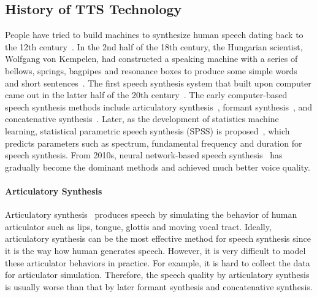 \documentclass{article}
\begin{document}
\subsection{History of TTS Technology}
People have tried to build machines to synthesize human speech dating back to the 12th century~\cite{wiki_Speech_synthesis}. In the 2nd half of the 18th century, the Hungarian scientist, Wolfgang von Kempelen, had constructed a speaking machine with a series of bellows, springs, bagpipes and resonance boxes to produce some simple words and short sentences~\cite{dudley1950speaking}. The first speech synthesis system that built upon computer came out in the latter half of the 20th century~\cite{wiki_Speech_synthesis}. The early computer-based speech synthesis methods include articulatory synthesis~\cite{coker1976model,shadle2001prospects}, formant synthesis~\cite{seeviour1976automatic,allen1979mitalk,klatt1980software,klatt1987review}, and concatenative synthesis~\cite{olive1977rule,moulines1990pitch,sagisaka1992atr,hunt1996unit,black1998festival}. Later, as the development of statistics machine learning, statistical parametric speech synthesis (SPSS) is proposed~\cite{yoshimura1999simultaneous,tokuda2000speech,zen2009statistical,tokuda2013speech}, which predicts parameters such as spectrum, fundamental frequency and duration for speech synthesis. From 2010s, neural network-based speech synthesis~\cite{zen2013statistical,qian2014training,fan2014tts,zen2015unidirectional,wang2016first,li2018emphasis,oord2016wavenet,wang2017tacotron} has gradually become the dominant methods and achieved much better voice quality.

\paragraph{Articulatory Synthesis}
Articulatory synthesis~\cite{coker1976model,shadle2001prospects} produces speech by simulating the behavior of human articulator such as lips, tongue, glottis and moving vocal tract. Ideally, articulatory synthesis can be the most effective method for speech synthesis since it is the way how human generates speech. However, it is very difficult to model these articulator behaviors in practice. For example, it is hard to collect the data for articulator simulation. Therefore, the speech quality by articulatory synthesis is usually worse than that by later formant synthesis and concatenative synthesis.
\end{document}

